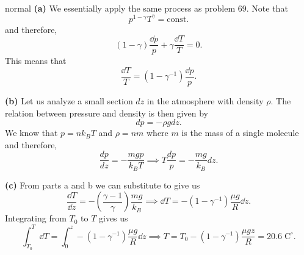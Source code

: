 \begin{solution}{normal}
\textbf{(a)} We essentially apply the same process as problem 69. Note that 
\[p^{1 - \gamma} T^{\gamma} = \text{const.}\]
and therefore, 
\[(1 - \gamma) \frac{\dd p}{p} + \gamma \frac{\dd T}{T} = 0.\]
This means that 
\[\frac{\dd T}{T} = (1 - \gamma^{-1})\frac{\dd p}{p}.\]
\vspace{3mm}

\noindent \textbf{(b)} Let us analyze a small section $dz$ in the atmosphere with density $\rho$. The relation between pressure and density is then given by 
\[dp = - \rho g dz.\]
We know that $p = n k_B T$ and $\rho = nm$ where $m$ is the mass of a single molecule and therefore, 
\[\frac{dp}{dz} = - \frac{mg p}{k_B T}\implies T \frac{dp}{p} = - \frac{mg}{k_B}dz.\]
\vspace{3mm}

\noindent \textbf{(c)} From parts a and b we can substitute to give us 
\[\frac{\dd T}{\dd z} = -\left(\frac{\gamma - 1}{\gamma}\right) \frac{mg}{k_B} \implies \dd T =  -(1 - \gamma^{-1}) \frac{\mu g}{R}\dd z.\]
Integrating from $T_0$ to $T$ gives us 
\[\int_{T_0}^{T} \dd T = \int_{0}^{z} -(1 - \gamma^{-1}) \frac{\mu g}{R}\dd z \implies T = T_0 - (1 - \gamma^{-1}) \frac{\mu g z}{R} = \boxed{20.6\;\mathrm{C}^{\circ}}.\]

\end{solution}